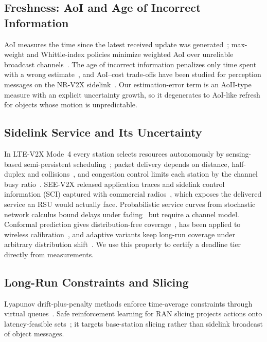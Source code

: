 \documentclass[journal]{IEEEtran}
\theoremstyle{remark}
\begin{document}
\subsection{Freshness: AoI and Age of Incorrect Information}
AoI measures the time since the latest received update was generated~\cite{kaul2012,yates2021aoi}; max-weight and Whittle-index policies minimize weighted AoI over unreliable broadcast channels~\cite{kadota2018}. The age of incorrect information penalizes only time spent with a wrong estimate~\cite{maatouk2020aoii}, and AoI--cost trade-offs have been studied for perception messages on the NR-V2X sidelink~\cite{andreani2025aoi}. Our estimation-error term is an AoII-type measure with an explicit uncertainty growth, so it degenerates to AoI-like refresh for objects whose motion is unpredictable.

\subsection{Sidelink Service and Its Uncertainty}
In LTE-V2X Mode~4 every station selects resources autonomously by sensing-based semi-persistent scheduling~\cite{molina2017ltev,ts36213}; packet delivery depends on distance, half-duplex and collisions~\cite{gonzalez2019analytical}, and congestion control limits each station by the channel busy ratio~\cite{saej3161,etsi102687}. SEE-V2X released application traces and sidelink control information (SCI) captured with commercial radios~\cite{seev2x}, which exposes the delivered service an RSU would actually face. Probabilistic service curves from stochastic network calculus bound delays under fading~\cite{fidler2006,jiang2008snc} but require a channel model. Conformal prediction gives distribution-free coverage~\cite{romano2019cqr,angelopoulos2023gentle}, has been applied to wireless calibration~\cite{cohen2023conformal}, and adaptive variants keep long-run coverage under arbitrary distribution shift~\cite{gibbs2021aci,angelopoulos2023pid}. We use this property to certify a deadline tier directly from measurements.

\subsection{Long-Run Constraints and Slicing}
Lyapunov drift-plus-penalty methods enforce time-average constraints through virtual queues~\cite{neely2010cdc,neely2010book}. Safe reinforcement learning for RAN slicing projects actions onto latency-feasible sets~\cite{safeslice}; it targets base-station slicing rather than sidelink broadcast of object messages.
\end{document}
